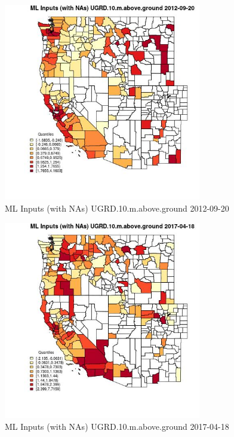 \clearpage 

\begin{figure} 
\centering  
\includegraphics[width=0.77\textwidth]{Code_Outputs/Report_ML_input_PM25_Step4_part_e_de_duplicated_aves_compiled_2019-05-14wNAs_CountyUGRD10mabovegroundMean2012-09-20_2012-09-20.jpg} 
\caption{\label{fig:Report_ML_input_PM25_Step4_part_e_de_duplicated_aves_compiled_2019-05-14wNAsCountyUGRD10mabovegroundMean2012-09-20_2012-09-20}ML Inputs (with NAs) UGRD.10.m.above.ground 2012-09-20} 
\end{figure} 
 

\begin{figure} 
\centering  
\includegraphics[width=0.77\textwidth]{Code_Outputs/Report_ML_input_PM25_Step4_part_e_de_duplicated_aves_compiled_2019-05-14wNAs_CountyUGRD10mabovegroundMean2017-04-18_2017-04-18.jpg} 
\caption{\label{fig:Report_ML_input_PM25_Step4_part_e_de_duplicated_aves_compiled_2019-05-14wNAsCountyUGRD10mabovegroundMean2017-04-18_2017-04-18}ML Inputs (with NAs) UGRD.10.m.above.ground 2017-04-18} 
\end{figure} 
 

